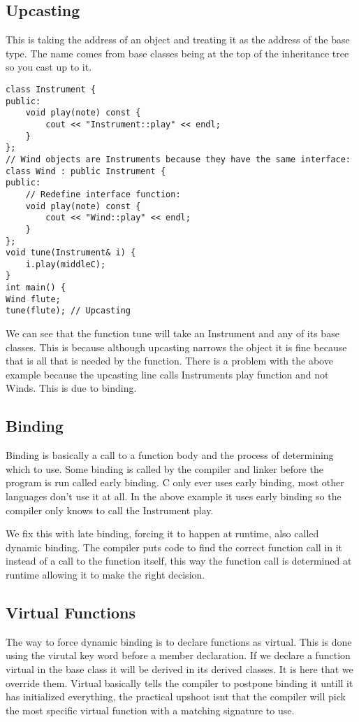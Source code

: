 \documentclass[12pt]{article}
\begin{document}
\subsection*{Upcasting}
This is taking the address of an object and treating it as the address of the base type. The name comes from base classes being at the top of the inheritance tree so you cast up to it.
\begin{lstlisting}
class Instrument {
public:
    void play(note) const {
        cout << "Instrument::play" << endl;
    }
};
// Wind objects are Instruments because they have the same interface:
class Wind : public Instrument {
public:
    // Redefine interface function:
    void play(note) const {
        cout << "Wind::play" << endl;
    }
};
void tune(Instrument& i) {
    i.play(middleC);
}
int main() {
Wind flute;
tune(flute); // Upcasting
\end{lstlisting}
We can see that the function tune will take an Instrument and any of its base classes. This is because although upcasting narrows the object it is fine because that is all that is needed by the function. There is a problem with the above example because the upcasting line calls Instruments play function and not Winds. This is due to binding.

\subsection*{Binding}
Binding is basically a call to a function body and the process of determining which to use. Some binding is called by the compiler and linker before the program is run called early binding. C only ever uses early binding, most other languages don't use it at all. In the above example it uses early binding so the compiler only knows to call the Instrument play.

We fix this with late binding, forcing it to happen at runtime, also called dynamic binding. The compiler puts code to find the correct function call in it instead of a call to the function itself, this way the function call is determined at runtime allowing it to make the right decision.

\subsection*{Virtual Functions}
The way to force dynamic binding is to declare functions as virtual.  This is done using the virutal key word before a member declaration. If we declare a function virtual in the base class it will be derived in its derived classes. It is here that we override them. Virtual basically tells the compiler to postpone binding it untill it has initialized everything, the practical upshoot isnt that the compiler will pick the most specific virtual function with a matching signature to use.
\end{document}
